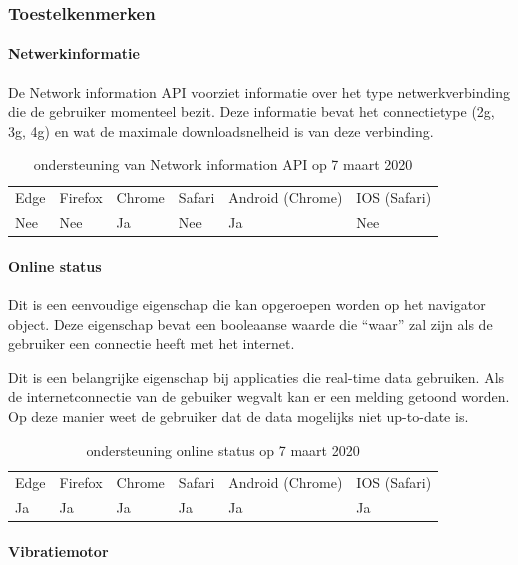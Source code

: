 \subsubsection{Toestelkenmerken}


\paragraph{Netwerkinformatie}

De Network information API \autocite{Lamouri2014} voorziet informatie over het type netwerkverbinding die de gebruiker momenteel bezit. Deze informatie bevat het connectietype (2g, 3g, 4g) en wat de maximale downloadsnelheid is van deze verbinding.

\begin{table}[H]
	\centering
	\begin{tabular}{llllll}
		Edge & Firefox & Chrome & Safari & Android (Chrome) & IOS (Safari) \\
		Nee   & Nee      &  Ja     & Nee     & Ja               & Nee          
	\end{tabular}	
	\caption{ondersteuning van Network information API op 7 maart 2020}
\end{table}

\paragraph{Online status}

Dit is een eenvoudige eigenschap die kan opgeroepen worden op het navigator object. Deze eigenschap bevat een booleaanse waarde die “waar” zal zijn als de gebruiker een connectie heeft met het internet. 

Dit is een belangrijke eigenschap bij applicaties die real-time data gebruiken. Als de internetconnectie van de gebuiker wegvalt kan er een melding  getoond worden. Op deze manier weet de gebruiker dat de data mogelijks niet up-to-date is.
\begin{table}[H]
	\centering
	\begin{tabular}{llllll}
		Edge & Firefox & Chrome & Safari & Android (Chrome) & IOS (Safari) \\
		Ja   & Ja      &  Ja     & Ja     & Ja               & Ja          
	\end{tabular}	
	\caption{ondersteuning online status op 7 maart 2020}
\end{table}

\paragraph{Vibratiemotor }

